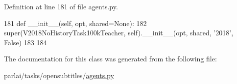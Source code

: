 Definition at line 181 of file agents.\+py.


\begin{DoxyCode}
181     \textcolor{keyword}{def }\_\_init\_\_(self, opt, shared=None):
182         super(V2018NoHistoryTask100kTeacher, self).\_\_init\_\_(opt, shared, \textcolor{stringliteral}{'2018'}, \textcolor{keyword}{False})
183 
184 
\end{DoxyCode}


The documentation for this class was generated from the following file\+:\begin{DoxyCompactItemize}
\item 
parlai/tasks/opensubtitles/\hyperlink{parlai_2tasks_2opensubtitles_2agents_8py}{agents.\+py}\end{DoxyCompactItemize}
